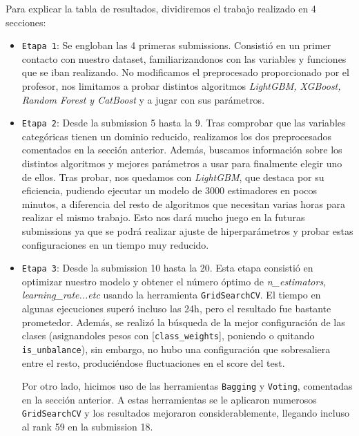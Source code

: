	
	
	Para explicar la tabla de resultados, dividiremos el trabajo realizado en 4 secciones:
	
	\begin{itemize}
		\item \texttt{Etapa 1}: Se engloban las 4 primeras submissions. Consistió en un primer contacto con nuestro dataset, familiarizandonos con las variables y funciones que se iban realizando. No modificamos el preprocesado proporcionado por el profesor, nos limitamos a probar distintos algoritmos \textit{LightGBM, XGBoost, Random Forest y CatBoost} y a jugar con sus parámetros.
		
		\item \texttt{Etapa 2}: Desde la submission 5 hasta la 9.
		Tras comprobar que las variables categóricas tienen un dominio reducido, realizamos los dos preprocesados comentados en la sección anterior. Además, buscamos información sobre los distintos algoritmos y mejores parámetros a usar para finalmente elegir uno de ellos. Tras probar, nos quedamos con \textit{LightGBM}, que destaca por su eficiencia, pudiendo ejecutar un modelo de 3000 estimadores en pocos minutos, a diferencia del resto de algoritmos que necesitan varias horas para realizar el mismo trabajo. Esto nos dará mucho juego en la futuras submissions ya que se podrá realizar ajuste de hiperparámetros y probar estas configuraciones en un tiempo muy reducido.
		
		\item \texttt{Etapa 3}: Desde la submission 10 hasta la 20. Esta etapa consistió en optimizar nuestro modelo y obtener  el número óptimo de \textit{n\_estimators, learning\_rate...etc} usando la herramienta \texttt{GridSearchCV}. El tiempo en algunas ejecuciones superó incluso las 24h, pero el resultado fue bastante prometedor. Además, se realizó la búsqueda de la mejor configuración de las clases (asignandoles pesos con [\texttt{class\_weights}], poniendo o quitando \texttt{is\_unbalance}), sin embargo, no hubo una configuración que sobresaliera entre el resto, produciéndose fluctuaciones en el score del test.
		
		Por otro lado, hicimos uso de las herramientas \texttt{Bagging} y \texttt{Voting}, comentadas en la sección anterior. A estas herramientas se le aplicaron numerosos \texttt{GridSearchCV} y los resultados mejoraron considerablemente, llegando incluso al rank 59 en la submission 18.
		

\end{itemize}
